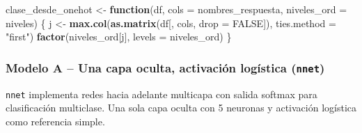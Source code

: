 \documentclass[
]{article}
\newenvironment{Shaded}{\begin{snugshade}}{\end{snugshade}}
\newcommand{\AttributeTok}[1]{\textcolor[rgb]{0.13,0.29,0.53}{#1}}
\newcommand{\ConstantTok}[1]{\textcolor[rgb]{0.56,0.35,0.01}{#1}}
\newcommand{\ControlFlowTok}[1]{\textcolor[rgb]{0.13,0.29,0.53}{\textbf{#1}}}
\newcommand{\FunctionTok}[1]{\textcolor[rgb]{0.13,0.29,0.53}{\textbf{#1}}}
\newcommand{\NormalTok}[1]{#1}
\newcommand{\OtherTok}[1]{\textcolor[rgb]{0.56,0.35,0.01}{#1}}
\newcommand{\StringTok}[1]{\textcolor[rgb]{0.31,0.60,0.02}{#1}}
\begin{document}
\begin{Shaded}
\begin{Highlighting}[]
\NormalTok{clase\_desde\_onehot }\OtherTok{\textless{}{-}} \ControlFlowTok{function}\NormalTok{(df, }\AttributeTok{cols =}\NormalTok{ nombres\_respuesta, }\AttributeTok{niveles\_ord =}\NormalTok{ niveles) \{}
\NormalTok{  j }\OtherTok{\textless{}{-}} \FunctionTok{max.col}\NormalTok{(}\FunctionTok{as.matrix}\NormalTok{(df[, cols, }\AttributeTok{drop =} \ConstantTok{FALSE}\NormalTok{]), }\AttributeTok{ties.method =} \StringTok{"first"}\NormalTok{)}
  \FunctionTok{factor}\NormalTok{(niveles\_ord[j], }\AttributeTok{levels =}\NormalTok{ niveles\_ord)}
\NormalTok{\}}
\end{Highlighting}
\end{Shaded}

\hypertarget{modelo-a-una-capa-oculta-activaciuxf3n-loguxedstica-nnet}{%
\subsubsection{\texorpdfstring{Modelo A -- Una capa oculta, activación
logística
(\texttt{nnet})}{Modelo A -- Una capa oculta, activación logística (nnet)}}\label{modelo-a-una-capa-oculta-activaciuxf3n-loguxedstica-nnet}}

\texttt{nnet} implementa redes hacia adelante multicapa con salida
softmax para clasificación multiclase. Una sola capa oculta con 5
neuronas y activación logística como referencia simple.
\end{document}
